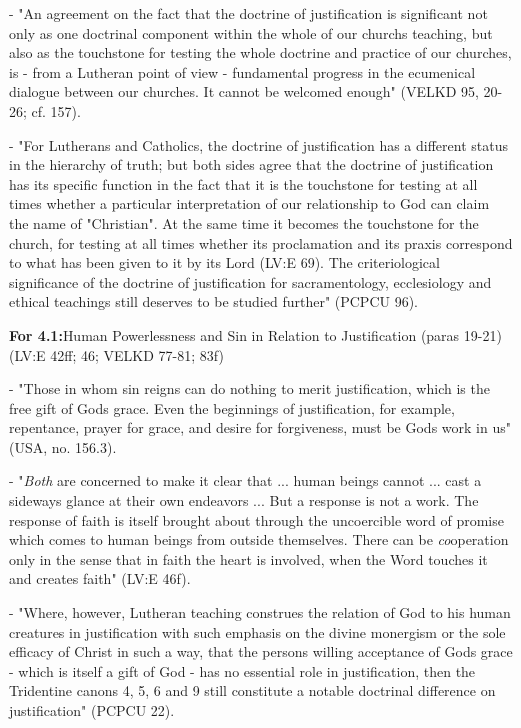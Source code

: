 - "An agreement on the fact that the doctrine of justification is
significant not only as one doctrinal component within the whole of our
church\textquotesingle s teaching, but also as the touchstone for
testing the whole doctrine and practice of our churches, is - from a
Lutheran point of view - fundamental progress in the ecumenical dialogue
between our churches. It cannot be welcomed enough" (VELKD 95, 20-26;
cf. 157).

- "For Lutherans and Catholics, the doctrine of justification has a
different status in the hierarchy of truth; but both sides agree that
the doctrine of justification has its specific function in the fact that
it is \textquotesingle the touchstone for testing at all times whether a
particular interpretation of our relationship to God can claim the name
of "Christian". At the same time it becomes the touchstone for the
church, for testing at all times whether its proclamation and its praxis
correspond to what has been given to it by its Lord\textquotesingle{}
(LV:E 69). The criteriological significance of the doctrine of
justification for sacramentology, ecclesiology and ethical teachings
still deserves to be studied further" (PCPCU 96).

\textbf{For 4.1:}Human Powerlessness and Sin in Relation to
Justification (paras 19-21) (LV:E 42ff; 46; VELKD 77-81; 83f)

- "Those in whom sin reigns can do nothing to merit justification, which
is the free gift of God\textquotesingle s grace. Even the beginnings of
justification, for example, repentance, prayer for grace, and desire for
forgiveness, must be God\textquotesingle s work in us" (USA, no. 156.3).

- "\emph{Both} are concerned to make it clear that ... human beings
cannot ... cast a sideways glance at their own endeavors ... But a
response is not a \textquotesingle work.\textquotesingle{} The response
of faith is itself brought about through the uncoercible word of promise
which comes to human beings from outside themselves. There can be
\textquotesingle{}\emph{co}operation\textquotesingle{} only in the sense
that in faith the heart is involved, when the Word touches it and
creates faith" (LV:E 46f).

- "Where, however, Lutheran teaching construes the relation of God to
his human creatures in justification with such emphasis on the divine
\textquotesingle monergism\textquotesingle{} or the sole efficacy of
Christ in such a way, that the person\textquotesingle s willing
acceptance of God\textquotesingle s grace - which is itself a gift of
God - has no essential role in justification, then the Tridentine canons
4, 5, 6 and 9 still constitute a notable doctrinal difference on
justification" (PCPCU 22).

